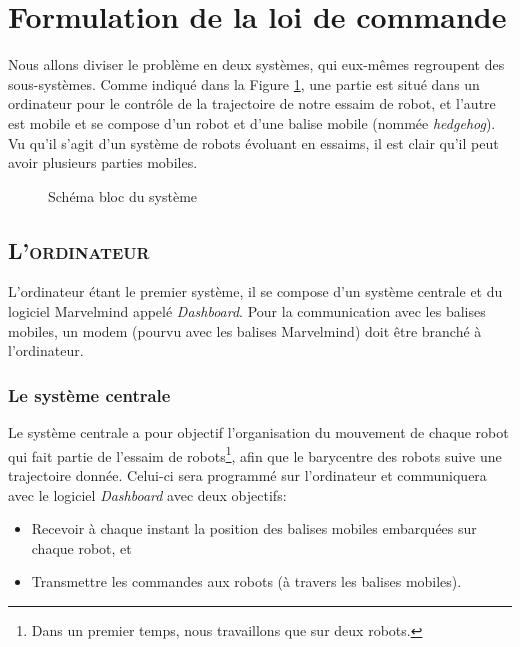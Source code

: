 \section{Formulation de la loi de commande}

Nous allons diviser le problème en deux systèmes, qui eux-mêmes regroupent des sous-systèmes. Comme indiqué dans la Figure \ref{fig:formulation_commande}, une partie est situé dans un ordinateur pour le contrôle de la trajectoire de notre essaim de robot, et l’autre est mobile et se compose d'un robot et d'une balise mobile (nommée \textit{hedgehog}). Vu qu'il s'agit d'un système de robots évoluant en essaims, il est clair qu'il peut avoir plusieurs parties mobiles.

\begin{figure}[h!]
    \centering
    
    \caption{Schéma bloc du système}
    \label{fig:formulation_commande}
\end{figure}


\subsection{\textsc{L'ordinateur}}
L'ordinateur étant le premier système, il se compose d'un système centrale et du logiciel Marvelmind appelé \textit{Dashboard}. Pour la communication avec les balises mobiles, un modem (pourvu avec les balises Marvelmind) doit être branché à l'ordinateur. 

\subsubsection{Le système centrale}



Le système centrale a pour objectif l'organisation du mouvement de chaque robot qui fait partie de l'essaim de robots\footnote{Dans un premier temps, nous travaillons que sur deux robots.}, afin que le barycentre des robots suive une trajectoire donnée. Celui-ci sera programmé sur l'ordinateur et communiquera avec le logiciel \textit{Dashboard} avec deux objectifs: 
\begin{itemize}
    \item Recevoir à chaque instant la position des balises mobiles embarquées sur chaque robot, et 
    \item Transmettre les commandes aux robots (à travers les balises mobiles). 
\end{itemize}

